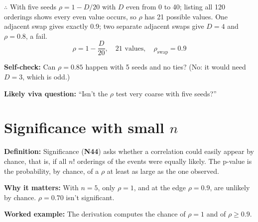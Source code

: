 \documentclass[11pt,a4paper,oneside,openany]{report}
\newcommand{\gl}[1]{\textbf{#1}}   %
\newcommand{\fdef}{\textbf{Definition:} }
\newcommand{\fwhy}{\par\textbf{Why it matters:} }
\newcommand{\fex}{\par\textbf{Worked example:} }
\newcommand{\fself}{\par\textbf{Self-check:} }
\newcommand{\fviva}{\par\textbf{Likely viva question:} }
\begin{document}
$\therefore$ With five seeds $\rho = 1 - D/20$ with $D$ even from 0 to 40; listing all 120 orderings shows every even value occurs, so $\rho$ has 21 possible values. One adjacent swap gives exactly 0.9; two separate adjacent swaps give $D = 4$ and $\rho = 0.8$, a fail.
\[\boxed{\rho = 1 - \frac{D}{20}, \quad 21 \text{ values}, \quad \rho_{\mathrm{swap}} = 0.9}\]

\fself Can $\rho = 0.85$ happen with 5 seeds and no ties? (No: it would need $D = 3$, which is odd.)
\fviva ``Isn't the $\rho$ test very coarse with five seeds?''

\section{Significance with small $n$}
\fdef Significance (\gl{N44}) asks whether a correlation could easily appear by chance, that is, if all $n!$ orderings of the events were equally likely. The p-value is the probability, by chance, of a $\rho$ at least as large as the one observed.
\fwhy With $n = 5$, only $\rho = 1$, and at the edge $\rho = 0.9$, are unlikely by chance. $\rho = 0.70$ isn't significant.
\fex The derivation computes the chance of $\rho = 1$ and of $\rho \ge 0.9$.
\end{document}
